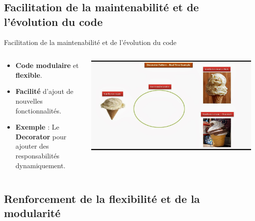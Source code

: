 \documentclass[aspectratio=169]{beamer}
\begin{document}
\subsection{Facilitation de la maintenabilité et de l'évolution du code}
\begin{frame}{Facilitation de la maintenabilité et de l'évolution du code}
    \begin{columns}
        \begin{column}{0.6\textwidth}
            \begin{itemize}
                \item \textbf{Code modulaire} et \textbf{flexible}.
                \item \textbf{Facilité} d'ajout de nouvelles fonctionnalités.
                      \pause
                \item \textbf{Exemple} : Le \textbf{Decorator} pour ajouter des responsabilités dynamiquement.
            \end{itemize}
        \end{column}
        \begin{column}{0.4\textwidth}
            \begin{center}
                \includegraphics[width=1.0\textwidth]{pic/decorator_pattern.png}
            \end{center}
        \end{column}
    \end{columns}
\end{frame}
\subsection{Renforcement de la flexibilité et de la modularité}
\end{document}
